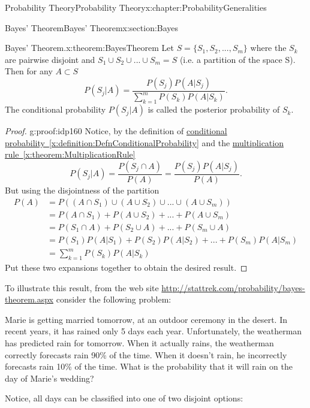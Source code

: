 \documentclass[oneside,10pt,]{book}
\newcommand{\xreffont}{\relax}
\numberwithin{equation}{section}
\begin{document}
\begin{chapterptx}{Probability Theory}{}{Probability Theory}{}{}{x:chapter:ProbabilityGeneralities}
\begin{sectionptx}{Bayes' Theorem}{}{Bayes' Theorem}{}{}{x:section:Bayes}
\begin{theorem}{Bayes' Theorem.}{}{x:theorem:BayesTheorem}%
Let \(S = \{ S_1, S_2, ... , S_m \}\) where the \(S_k\) are pairwise disjoint and \(S_1 \cup S_2 \cup ... \cup S_m = S\) (i.e. a partition of the space S).  Then for any \(A \subset S\)%
\begin{equation*}
P(S_j | A) = \frac{P(S_j)P(A | S_j)}{\sum_{k=1}^m P(S_k)P(A | S_k)}.
\end{equation*}
The conditional probability \(P(S_j | A)\) is called the posterior probability of \(S_k\).%
\end{theorem}
\begin{proof}{}{g:proof:idp160}
Notice, by the definition of \hyperref[x:definition:DefnConditionalProbability]{conditional probability~{\xreffont\ref{x:definition:DefnConditionalProbability}}} and the \hyperref[x:theorem:MultiplicationRule]{multiplication rule~{\xreffont\ref{x:theorem:MultiplicationRule}}}%
\begin{equation*}
P(S_j | A) = \frac{P(S_j \cap A)}{P(A)} = \frac{P(S_j)P( A | S_j)}{P(A)}.
\end{equation*}
But using the disjointness of the partition%
\begin{align*}
P(A) & = P( (A \cap S_1) \cup (A \cup S_2) \cup ... \cup (A \cup S_m) )\\
& = P(A \cap S_1) + P(A \cup S_2) + ... + P(A \cup S_m)\\
& = P(S_1 \cap A) + P(S_2 \cup A) + ... + P(S_m \cup A)\\
& = P(S_1) P(A | S_1) + P(S_2)P(A | S_2) + ... + P(S_m)P(A | S_m)\\
& = \sum_{k=1}^m P(S_k)P(A | S_k)
\end{align*}
Put these two expansions together to obtain the desired result.%
\end{proof}
To illustrate this result, from the web site \url{http://stattrek.com/probability/bayes-theorem.aspx} consider the following problem:%
\par
Marie is getting married tomorrow, at an outdoor ceremony in the desert. In recent years, it has rained only 5 days each year. Unfortunately, the weatherman has predicted rain for tomorrow. When it actually rains, the weatherman correctly forecasts rain 90\% of the time. When it doesn't rain, he incorrectly forecasts rain 10\% of the time. What is the probability that it will rain on the day of Marie's wedding?%
\par
Notice, all days can be classified into one of two disjoint options:%
\begin{itemize}[label=\textbullet]

\end{itemize}
\end{sectionptx}
\end{chapterptx}
\end{document}
